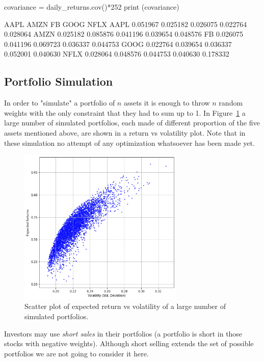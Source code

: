 \begin{ipython}
covariance = daily_returns.cov()*252
print (covariance)
\end{ipython}
\begin{ioutput}
          AAPL      AMZN        FB      GOOG      NFLX
AAPL  0.051967  0.025182  0.026075  0.022764  0.028064
AMZN  0.025182  0.085876  0.041196  0.039654  0.048576
FB    0.026075  0.041196  0.069723  0.036337  0.044753
GOOG  0.022764  0.039654  0.036337  0.052001  0.040630
NFLX  0.028064  0.048576  0.044753  0.040630  0.178332
\end{ioutput}
    
\subsection{Portfolio Simulation}
In order to "simulate" a portfolio of $n$ assets it is enough to throw $n$ random weights with the only constraint that they had to sum up to 1. 
In Figure~\ref{fig:mc_portfolio} a large number of simulated portfolios, each made of different proportion of the five assets mentioned above, are shown in a return vs volatility plot. 
Note that in these simulation no attempt of any optimization whatsoever has been made yet.

\begin{figure}[hbtp]
\centering
\includegraphics[width=0.7\textwidth]{figures/return_variance}
\caption{Scatter plot of expected return vs volatility of a large number of simulated portfolios.}
\label{fig:mc_portfolio}
\end{figure}

Investors may use \emph{short sales} in their portfolios (a portfolio is short in those stocks with negative weights). 
Although short selling extends the set of possible portfolios we are not going to consider it here.

